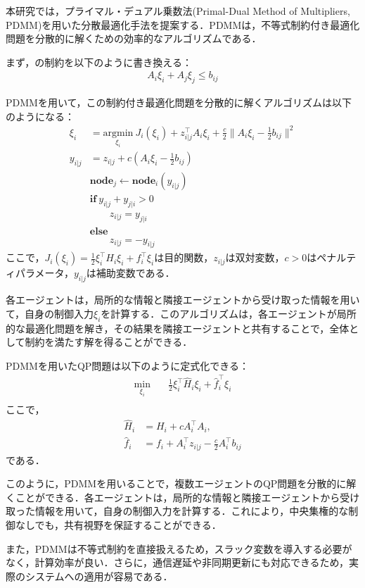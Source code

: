 本研究では，プライマル・デュアル乗数法(Primal-Dual Method of Multipliers, PDMM)を用いた分散最適化手法を提案する．PDMMは，不等式制約付き最適化問題を分散的に解くための効率的なアルゴリズムである．

まず，の制約を以下のように書き換える：
\begin{equation}
\begin{aligned}
A_i \xi_i + A_j \xi_j \leq b_{ij}
\label{eq:common_cbf_constraint_rewritten}
\end{aligned}
\end{equation}

PDMMを用いて，この制約付き最適化問題を分散的に解くアルゴリズムは以下のようになる：
\begin{equation}
\begin{aligned}
\xi_i &= \underset{\xi_i}{\mathrm{argmin}} \:J_i(\xi_i) + z_{i|j}^\top A_i\xi_i + \frac{c}{2}\|A_i\xi_i - \frac{1}{2}b_{ij}\|^2 \\
y_{i|j} &= z_{i|j} + c(A_i\xi_i - \frac{1}{2}b_{ij}) \\
&\mathbf{node}_j \leftarrow \mathbf{node}_i(y_{i|j}) \\
&\mathbf{if}\:y_{i|j} + y_{j|i} > 0 \\
&\qquad z_{i|j} = y_{j|i} \\
&\mathbf{else} \\
&\qquad z_{i|j} = -y_{i|j}
\label{eq:pdmm_algorithm}
\end{aligned}
\end{equation}
ここで，$J_i(\xi_i) = \frac{1}{2}\xi_i^\top H_i \xi_i + f_i^\top \xi_i$は目的関数，$z_{i|j}$は双対変数，$c > 0$はペナルティパラメータ，$y_{i|j}$は補助変数である．

各エージェントは，局所的な情報と隣接エージェントから受け取った情報を用いて，自身の制御入力$\xi_i$を計算する．このアルゴリズムは，各エージェントが局所的な最適化問題を解き，その結果を隣接エージェントと共有することで，全体として制約を満たす解を得ることができる．

PDMMを用いたQP問題は以下のように定式化できる：
\begin{equation}
\begin{aligned}
\min_{\xi_i} \quad & \frac{1}{2}\xi_i^\top \hat{H}_i \xi_i + \hat{f}_i^\top \xi_i \\
\label{eq:pdmm_qp}
\end{aligned}
\end{equation}
ここで，
\begin{equation}
\begin{aligned}
\hat{H}_i &= H_i + c A_i^\top A_i, \\
\hat{f}_i &= f_i + A_i^\top z_{i|j} - \frac{c}{2}A_i^\top b_{ij}
\label{eq:pdmm_qp_params}
\end{aligned}
\end{equation}
である．

このように，PDMMを用いることで，複数エージェントのQP問題を分散的に解くことができる．各エージェントは，局所的な情報と隣接エージェントから受け取った情報を用いて，自身の制御入力を計算する．これにより，中央集権的な制御なしでも，共有視野を保証することができる．

また，PDMMは不等式制約を直接扱えるため，スラック変数を導入する必要がなく，計算効率が良い．さらに，通信遅延や非同期更新にも対応できるため，実際のシステムへの適用が容易である．
